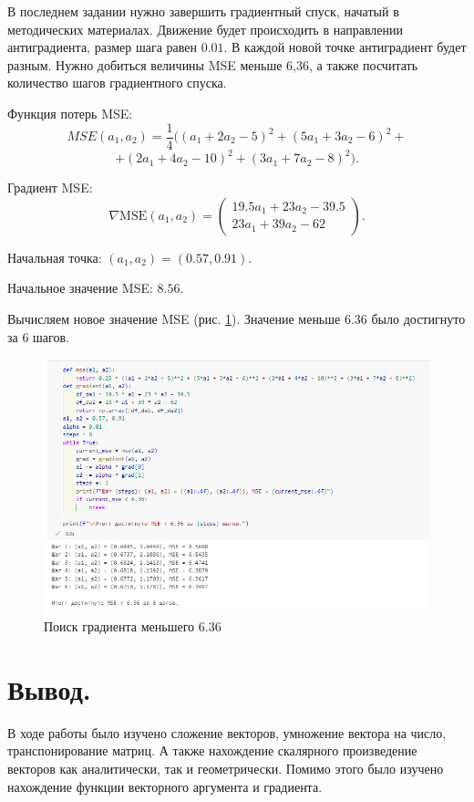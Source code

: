 \documentclass[14pt,a4paper]{extarticle}
\begin{document}
В последнем задании нужно завершить градиентный спуск,
начатый в методических материалах. Движение будет происходить в направлении антиградиента,
размер шага равен $0.01$. В каждой новой точке антиградиент будет разным. Нужно добиться величины MSE меньше 6,36,
а также посчитать количество шагов градиентного спуска.

Функция потерь MSE:
\[{MSE}(a_1, a_2) = \frac{1}{4} ((a_1 + 2a_2 - 5)^2 + (5a_1 + 3a_2 - 6)^2 +\]\[+ (2a_1 + 4a_2 - 10)^2 +(3a_1 + 7a_2 - 8)^2).\]

Градиент MSE:
\[\nabla \text{MSE}(a_1, a_2) = \begin{pmatrix}19.5a_1 + 23a_2 - 39.5 \\ 23a_1 + 39a_2 - 62\end{pmatrix}.\]

Начальная точка: $(a_1, a_2) = (0.57, 0.91).$

Начальное значение MSE: $8.56.$

Вычисляем новое значение MSE (рис. \ref{pic:mse}). Значение меньше $6.36$ было достигнуто за 6 шагов.

\begin{figure}[h!]
    \centering
    \includegraphics[scale=0.7]{pic7/mse.png}
    \caption{Поиск градиента меньшего $6.36$}
    \label{pic:mse}
\end{figure}
\FloatBarrier

\section*{Вывод.}

В ходе работы было изучено сложение векторов, умножение вектора на число, транспонирование матриц. А также нахождение
скалярного произведение векторов как аналитически, так и геометрически. Помимо этого было изучено нахождение
функции векторного аргумента и градиента.
\end{document}
